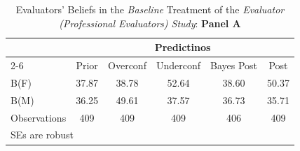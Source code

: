 \begin{table}[htbp]\centering
\caption{Evaluators' Beliefs in the \textit{Baseline} Treatment of the \textit{Evaluator (Professional Evaluators) Study}: \textbf{Panel A}}
\begin{tabular}{l*{5}{c}}
\hline\hline
                &\multicolumn{5}{c}{Predictinos}                  \\\cmidrule(lr){2-6}
                &\multicolumn{1}{c}{Prior}&\multicolumn{1}{c}{Overconf}&\multicolumn{1}{c}{Underconf}&\multicolumn{1}{c}{Bayes Post}&\multicolumn{1}{c}{Post}\\
\hline
B(F)            &    37.87&    38.78&    52.64&    38.60&    50.37\\
B(M)            &    36.25&    49.61&    37.57&    36.73&    35.71\\
\hline
Observations    &      409&      409&      409&      406&      409\\
\hline\hline
\multicolumn{6}{l}{\footnotesize SEs are robust}\\
\end{tabular}
\end{table}
